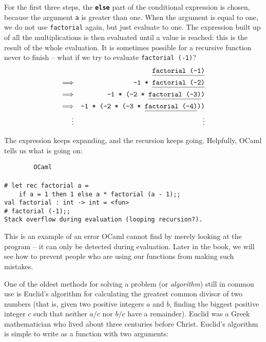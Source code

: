 \documentclass[]{book}
\newcommand{\smspace}{\vspace{4mm}}
\begin{document}
\noindent For the first three steps, the \textbf{\texttt{else}} part of the conditional expression is chosen, because the argument \texttt{a} is greater than one. When the argument is equal to one, we do not use \texttt{factorial} again, but just evaluate to one. The expression built up of all the multiplications is then evaluated until a value is reached: this is the result of the whole evaluation. It is sometimes possible for a recursive function never to finish -- what if we try to evaluate \texttt{factorial\! (-1)}?
\begin{eqnarray*}
 & & \texttt{\underline{\vphantom{g}factorial (-1)}} \\
 \Longrightarrow & & \texttt{-1 * \underline{\vphantom{g}factorial (-2)}} \\
 \Longrightarrow & & \texttt{-1 * (-2 * \underline{\vphantom{g}factorial (-3)})} \\
 \Longrightarrow & & \texttt{-1 * (-2 * (-3 * \underline{\vphantom{g}factorial (-4)}))}\\
 \vdots && \vdots
\end{eqnarray*}

\noindent The expression keeps expanding, and the recursion keeps going. Helpfully, OCaml tells us what is going on:

\smspace
\noindent\verb!        OCaml!\\
\noindent\\
\noindent\verb!# let rec factorial a =!\\
\noindent\verb!    if a = 1 then 1 else a * factorial (a - 1);;!\\
\noindent\verb!val factorial : int -> int = <fun>!\\
\noindent\texttt{\# factorial (-1);;}\\
\noindent\verb!Stack overflow during evaluation (looping recursion?).!
\smspace

\noindent This is an example of an error OCaml cannot find by merely looking at the program -- it can only be detected during evaluation. Later in the book, we will see how to prevent people who are using our functions from making such mistakes.

One of the oldest methods for solving a problem (or \textit{algorithm}) still in common use is Euclid's algorithm for calculating the greatest common divisor of two numbers (that is, given two positive integers $a$ and $b$, finding the biggest positive integer $c$ such that neither $a / c$ nor $b / c$ have a remainder). Euclid was a Greek mathematician who lived about three centuries before Christ. Euclid's algorithm is simple to write as a function with two arguments:
\end{document}
